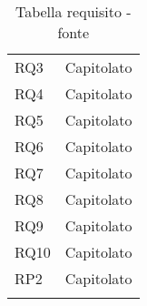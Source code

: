 {\begin{longtable}{C{.47\freewidth} C{.47\freewidth}}
      RQ3 & Capitolato\\
      RQ4 & Capitolato\\
      RQ5 & Capitolato\\
      RQ6 & Capitolato\\
      RQ7 & Capitolato\\
      RQ8 & Capitolato\\
      RQ9 & Capitolato\\
      RQ10 & Capitolato\\

      RP2 & Capitolato\\
      \bottomrule
      \caption{Tabella requisito - fonte}
      \end{longtable}
}
